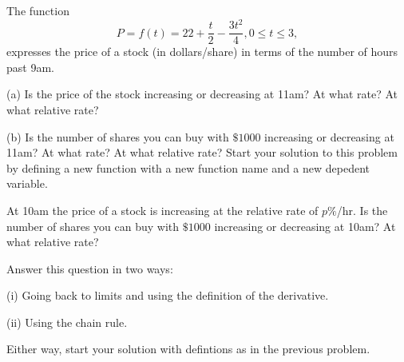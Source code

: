 \documentclass{ximera}
\begin{document}
\begin{question}  \label{Ex:pdfsd0tr}
The function 
\[
       P  = f(t) = 22 + \frac{t}{2} - \frac{3t^2}{4} , 0\leq t \leq 3 , 
\]
expresses the price of a stock (in dollars/share) in terms of the number of hours past 9am.

(a) Is the price of the stock increasing or decreasing at 11am? At what rate? At what relative rate?

(b) Is the number of shares you can buy with $\$1000$ increasing or decreasing at 11am? At what rate? At what relative rate? 
Start your solution to this problem by defining a new function with a new function name and a new depedent variable.

\end{question}


\begin{question} \label{Ex:sd0fset}
At 10am the price of a stock is increasing at the relative rate of $p\%$/hr. Is the number of shares you can buy with $\$1000$ increasing or decreasing at 10am? At what relative rate?

Answer this question in two ways:

(i) Going back to limits and using the definition of the derivative.

(ii) Using the chain rule.

Either way, start your solution with defintions as in the previous problem.

\end{question}
\end{document}
